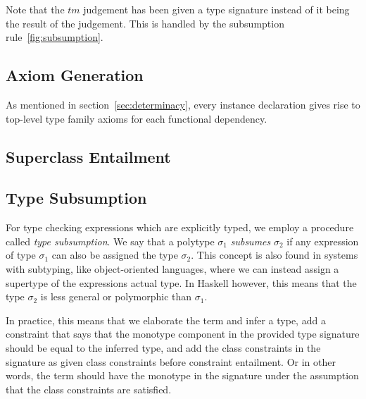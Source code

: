 Note that the $tm$ judgement has been given a type signature instead of
it being the result of the judgement. This is handled by the subsumption
rule~\ref{fig:subsumption}.
\subsection{Axiom Generation}
As mentioned in section~\ref{sec:determinacy}, every instance declaration gives rise
to top-level type family axioms for each functional dependency.
\subsection{Superclass Entailment}


\subsection{Type Subsumption}
For type checking expressions which are explicitly typed, we employ a procedure
called \textit{type subsumption}. We say that a polytype $\sigma_1$
\textit{subsumes} $\sigma_2$ if any expression of type $\sigma_1$ can also be
assigned the type $\sigma_2$. This concept is also found in systems with
subtyping, like object-oriented languages, where we can instead assign a
supertype of the expressions actual type. In Haskell however, this means that
the type $\sigma_2$ is less general or polymorphic than $\sigma_1$.

In practice, this means that we elaborate the term and infer a type, add a
constraint that says that the monotype component in the provided type signature
should be equal to the inferred type, and add the class constraints in the
signature as given class constraints before constraint entailment. Or in other
words, the term should have the monotype in the signature under the assumption
that the class constraints are satisfied.

